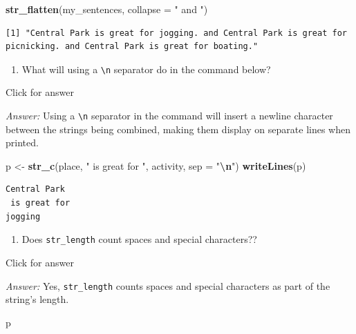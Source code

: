 \documentclass[
]{book}
\newenvironment{Shaded}{\begin{snugshade}}{\end{snugshade}}
\newcommand{\AttributeTok}[1]{\textcolor[rgb]{0.13,0.29,0.53}{#1}}
\newcommand{\FunctionTok}[1]{\textcolor[rgb]{0.13,0.29,0.53}{\textbf{#1}}}
\newcommand{\NormalTok}[1]{#1}
\newcommand{\OtherTok}[1]{\textcolor[rgb]{0.56,0.35,0.01}{#1}}
\newcommand{\SpecialCharTok}[1]{\textcolor[rgb]{0.81,0.36,0.00}{\textbf{#1}}}
\newcommand{\StringTok}[1]{\textcolor[rgb]{0.31,0.60,0.02}{#1}}
\providecommand{\tightlist}{%
  \setlength{\itemsep}{0pt}\setlength{\parskip}{0pt}}
\begin{document}
\begin{Shaded}
\begin{Highlighting}[]
\FunctionTok{str\_flatten}\NormalTok{(my\_sentences, }\AttributeTok{collapse =} \StringTok{" and "}\NormalTok{)}
\end{Highlighting}
\end{Shaded}

\begin{verbatim}
[1] "Central Park is great for jogging. and Central Park is great for picnicking. and Central Park is great for boating."
\end{verbatim}

\begin{enumerate}
\def\labelenumi{\alph{enumi}.}
\setcounter{enumi}{3}
\tightlist
\item
  What will using a \texttt{\textbackslash{}n} separator do in the command below?
\end{enumerate}

Click for answer

\emph{Answer:} Using a \texttt{\textbackslash{}n} separator in the command will insert a newline character between the strings being combined, making them display on separate lines when printed.

\begin{Shaded}
\begin{Highlighting}[]
\NormalTok{p }\OtherTok{\textless{}{-}} \FunctionTok{str\_c}\NormalTok{(place, }\StringTok{" is great for "}\NormalTok{, activity, }\AttributeTok{sep =} \StringTok{"}\SpecialCharTok{\textbackslash{}n}\StringTok{"}\NormalTok{)}
\FunctionTok{writeLines}\NormalTok{(p)}
\end{Highlighting}
\end{Shaded}

\begin{verbatim}
Central Park
 is great for 
jogging
\end{verbatim}

\begin{enumerate}
\def\labelenumi{\alph{enumi}.}
\setcounter{enumi}{4}
\tightlist
\item
  Does \texttt{str\_length} count spaces and special characters??
\end{enumerate}

Click for answer

\emph{Answer:} Yes, \texttt{str\_length} counts spaces and special characters as part of the string's length.

\begin{Shaded}
\begin{Highlighting}[]
\NormalTok{p}
\end{Highlighting}
\end{Shaded}
\end{document}

